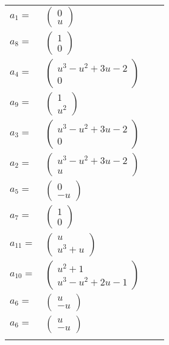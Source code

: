 \documentclass[1p]{elsarticle_modified}
\theoremstyle{definition}
\begin{document}
\begin{tabular}{m{7pt} m{180pt} m{7pt} m{180pt} }
\flushright $a_{1}=$&$\begin{pmatrix}0\\u\end{pmatrix}$ \\
\flushright $a_{8}=$&$\begin{pmatrix}1\\0\end{pmatrix}$ \\
\flushright $a_{4}=$&$\begin{pmatrix}u^3- u^2+3 u-2\\0\end{pmatrix}$ \\
\flushright $a_{9}=$&$\begin{pmatrix}1\\u^2\end{pmatrix}$ \\
\flushright $a_{3}=$&$\begin{pmatrix}u^3- u^2+3 u-2\\0\end{pmatrix}$ \\
\flushright $a_{2}=$&$\begin{pmatrix}u^3- u^2+3 u-2\\u\end{pmatrix}$ \\
\flushright $a_{5}=$&$\begin{pmatrix}0\\- u\end{pmatrix}$ \\
\flushright $a_{7}=$&$\begin{pmatrix}1\\0\end{pmatrix}$ \\
\flushright $a_{11}=$&$\begin{pmatrix}u\\u^3+u\end{pmatrix}$ \\
\flushright $a_{10}=$&$\begin{pmatrix}u^2+1\\u^3- u^2+2 u-1\end{pmatrix}$ \\
\flushright $a_{6}=$&$\begin{pmatrix}u\\- u\end{pmatrix}$\\ \flushright $a_{6}=$&$\begin{pmatrix}u\\- u\end{pmatrix}$\\&\end{tabular}
\end{document}
